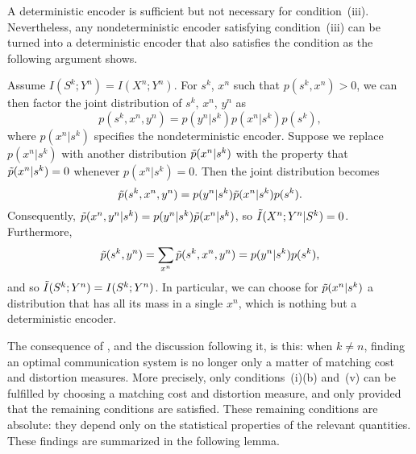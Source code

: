 %
\begin{remark}
  \label{rem:inflosslessenc}
  A deterministic encoder is sufficient but not necessary for condition~(iii).
  Nevertheless, any nondeterministic encoder satisfying condition~(iii) can be
  turned into a deterministic encoder that also satisfies the condition as the
  following argument shows. 

  Assume $I(S^k; Y^n) = I(X^n;Y^n)$. For $s^k$, $x^n$ such that $p(s^k, x^n) >
  0$, we can then factor the joint distribution of $s^k$, $x^n$, $y^n$ as
  \begin{equation*}
    p(s^k, x^n, y^n) = p(y^n | s^k) p(x^n|s^k) p(s^k),
  \end{equation*}
  where $p(x^n|s^k)$ specifies the nondeterministic encoder. Suppose we replace
  $p(x^n|s^k)$ with another distribution $\tilde{p}(x^n|s^k)$ with the property that
  $\tilde{p}(x^n|s^k) = 0$ whenever $p(x^n|s^k) = 0$. Then the joint distribution
  becomes
  \begin{equation*}
    \tilde{p}(s^k,x^n,y^n) = p(y^n|s^k) \tilde{p}(x^n|s^k) p(s^k).
  \end{equation*}
  Consequently, $\tilde{p}(x^n,y^n|s^k) = p(y^n|s^k)\tilde{p}(x^n|s^k)$, so
  $\tilde{I}(X^n;Y^n|S^k) = 0$. Furthermore,
  \begin{equation*}
    \tilde{p}(s^k,y^n) = \sum_{x^n} \tilde{p}(s^k, x^n, y^n) = p(y^n|s^k) p(s^k),
  \end{equation*}
  and so $\tilde{I}(S^k;Y^n) = I(S^k; Y^n)$. In particular, we can choose for
  $\tilde{p}(x^n|s^k)$ a distribution that has all its mass in a single $x^n$,
  which is nothing but a deterministic encoder. 
\end{remark}

The consequence of , and the discussion following it, is this:
when $k \ne n$, finding an optimal communication system is no longer only a
matter of matching cost and distortion measures. More precisely, only
conditions~(i)(b) and~(v) can be fulfilled by choosing a matching cost and
distortion measure, and only provided that the remaining conditions are
satisfied. These remaining conditions are absolute: they depend only on the
statistical properties of the relevant quantities. These findings are summarized
in the following lemma.


